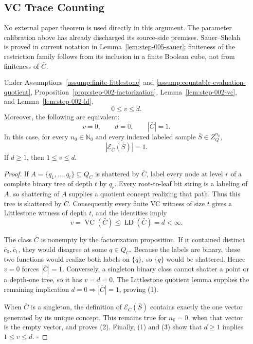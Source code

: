 \subsection{VC Trace Counting}\label{app:step_005}


No external paper theorem is used directly in this argument.  The 
parameter calibration above has already discharged its source-side premises.
Sauer--Shelah~\citep{sauer1972} is proved in current notation in
Lemma~\ref{lem:step-005-sauer}; finiteness of the restriction family follows
from its inclusion in a finite Boolean cube, not from finiteness of
\(\bar C\).

\begin{lemma}\label{lem:step-005-branches}
Under Assumptions~\ref{assump:finite-littlestone} and
\ref{assump:countable-evaluation-quotient}, Proposition~\ref{prop:step-002-factorization},
Lemma~\ref{lem:step-002-vc}, and Lemma~\ref{lem:step-002-ld},
\[
0\le v\le d.
\]
Moreover, the following are equivalent:
\[
v=0,\qquad d=0,\qquad |\bar C|=1.
\tag{1}
\]
In this case, for every \(n_0\in\mathbb N_0\) and every indexed labeled
sample \(\bar S\in Z_Q^{n_0}\),
\[
|\mathcal E_{\bar C}(\bar S)|=1.
\tag{2}
\]
If \(d\ge1\), then \(1\le v\le d\).


\end{lemma}

\begin{proof}
If \(A=\{q_1,\ldots,q_t\}\subseteq Q_C\) is shattered by
\(\bar C\), label every node at level \(r\) of a complete binary tree of
depth \(t\) by \(q_r\).  Every root-to-leaf bit string is a labeling of
\(A\), so shattering of \(A\) supplies a quotient concept realizing that
path.  Thus this tree is shattered by \(\bar C\).  Consequently every
finite VC witness of size \(t\) gives a Littlestone witness of depth \(t\),
and the  identities imply
\[
v=\operatorname{VC}(\bar C)
\le \operatorname{LD}(\bar C)=d<\infty.
\tag{3}
\]

The class \(\bar C\) is nonempty by the  factorization proposition.
If it contained distinct \(\bar c_0,\bar c_1\), they would disagree at some
\(q\in Q_C\).  Because the labels are binary, these two functions would
realize both labels on \(\{q\}\), so \(\{q\}\) would be shattered.  Hence
\(v=0\) forces \(|\bar C|=1\).  Conversely, a singleton binary class cannot
shatter a point or a depth-one tree, so it has \(v=d=0\).  The 
Littlestone quotient lemma supplies the remaining implication
\(d=0\Rightarrow|\bar C|=1\), proving (1).

When \(\bar C\) is a singleton, the definition of
\(\mathcal E_{\bar C}(\bar S)\) contains exactly the one vector generated by
its unique concept.  This remains true for \(n_0=0\), when that vector is
the empty vector, and proves (2).  Finally, (1) and (3) show that \(d\ge1\)
implies \(1\le v\le d\). \(\square\)


\end{proof}

